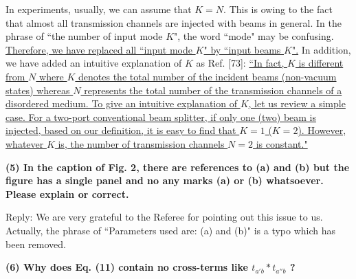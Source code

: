 \documentclass[10pt]{article}
\begin{document}
In experiments, usually, we can assume that $K=N$. This is owing to the fact that almost all transmission channels are injected with beams in general. In the phrase of ``the number of input mode $K$", the word ``mode" may be confusing. {\uline{Therefore, we have replaced all ``input mode $K$" by ``input beams $K$".}} In addition, we have added an intuitive explanation of $K$ as Ref. [73]: {\uline{``In fact, $K$ is different from $N$ where $K$ denotes the total number of the incident beams (non-vacuum states) whereas $N$ represents the total number of the transmission channels of a disordered medium. To give an intuitive explanation of $K$, let us review a simple case. For a two-port conventional beam splitter, if only one (two) beam is injected, based on our definition, it is easy to find that $K=1$ ($K=2$). However, whatever $K$ is, the number of transmission channels $N=2$ is constant." }}



{\bf{(5) In the caption of Fig. 2, there are references to (a) and (b) but the figure has a single panel and no any marks (a) or (b) whatsoever. Please explain or correct.}}

Reply: We are very grateful to the Referee for pointing out this issue to us. Actually, the phrase of ``Parameters used are: (a) and (b)" is a typo which has been removed.

{\bf{(6) Why does Eq. (11) contain no cross-terms like $t_{a'b} \ast t_{a''b}$ ?}}
\end{document}
